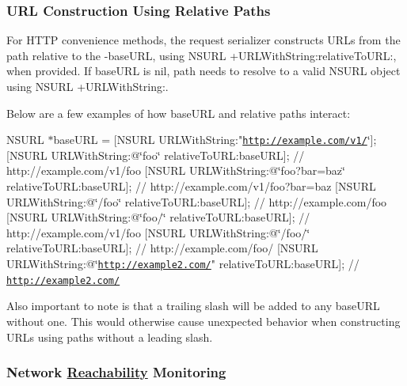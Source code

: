 \subsubsection*{U\+RL Construction Using Relative Paths}

For H\+T\+TP convenience methods, the request serializer constructs U\+R\+Ls from the path relative to the {\ttfamily -\/base\+U\+RL}, using {\ttfamily N\+S\+U\+RL +\+U\+R\+L\+With\+String\+:relative\+To\+U\+RL\+:}, when provided. If {\ttfamily base\+U\+RL} is {\ttfamily nil}, {\ttfamily path} needs to resolve to a valid {\ttfamily N\+S\+U\+RL} object using {\ttfamily N\+S\+U\+RL +\+U\+R\+L\+With\+String\+:}.

Below are a few examples of how {\ttfamily base\+U\+RL} and relative paths interact\+:

N\+S\+U\+RL $\ast$base\+U\+RL = \mbox{[}N\+S\+U\+RL U\+R\+L\+With\+String\+:"\href{http://example.com/v1/}{\tt http\+://example.\+com/v1/}\char`\"{}\mbox{]};
   \mbox{[}\+N\+S\+U\+R\+L U\+R\+L\+With\+String\+:@\char`\"{}foo\char`\"{} relative\+To\+U\+R\+L\+:base\+U\+R\+L\mbox{]};                  // http\+://example.\+com/v1/foo
   \mbox{[}\+N\+S\+U\+R\+L U\+R\+L\+With\+String\+:@\char`\"{}foo?bar=baz\char`\"{} relative\+To\+U\+R\+L\+:base\+U\+R\+L\mbox{]};          // http\+://example.\+com/v1/foo?bar=baz
   \mbox{[}\+N\+S\+U\+R\+L U\+R\+L\+With\+String\+:@\char`\"{}/foo\char`\"{} relative\+To\+U\+R\+L\+:base\+U\+R\+L\mbox{]};                 // http\+://example.\+com/foo
   \mbox{[}\+N\+S\+U\+R\+L U\+R\+L\+With\+String\+:@\char`\"{}foo/\char`\"{} relative\+To\+U\+R\+L\+:base\+U\+R\+L\mbox{]};                 // http\+://example.\+com/v1/foo
   \mbox{[}\+N\+S\+U\+R\+L U\+R\+L\+With\+String\+:@\char`\"{}/foo/\char`\"{} relative\+To\+U\+R\+L\+:base\+U\+R\+L\mbox{]};                // http\+://example.\+com/foo/
   \mbox{[}\+N\+S\+U\+R\+L U\+R\+L\+With\+String\+:@\char`\"{}\href{http://example2.com/}{\tt http\+://example2.\+com/}" relative\+To\+U\+RL\+:base\+U\+RL\mbox{]}; // \href{http://example2.com/}{\tt http\+://example2.\+com/}

Also important to note is that a trailing slash will be added to any {\ttfamily base\+U\+RL} without one. This would otherwise cause unexpected behavior when constructing U\+R\+Ls using paths without a leading slash.

\subsubsection*{Network \mbox{\hyperlink{interface_reachability}{Reachability}} Monitoring}

